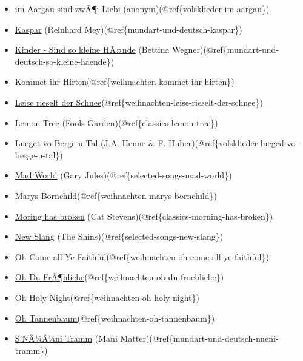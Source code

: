 \documentclass[
]{article}
\begin{document}
\begin{itemize}
\item
  \protect\hyperlink{volsklieder-im-aargau}{im Aargau sind zwÃ¶i Liebi}
  (anonym)(@ref\{volsklieder-im-aargau\})
\item
  \protect\hyperlink{mundart-und-deutsch-kaspar}{Kaspar} (Reinhard
  Mey)(@ref\{mundart-und-deutsch-kaspar\})
\item
  \protect\hyperlink{mundart-und-deutsch-so-kleine-haende}{Kinder - Sind
  so kleine HÃ¤nde} (Bettina
  Wegner)(@ref\{mundart-und-deutsch-so-kleine-haende\})
\item
  \protect\hyperlink{weihnachten-kommet-ihr-hirten}{Kommet ihr
  Hirten}(@ref\{weihnachten-kommet-ihr-hirten\})
\item
  \protect\hyperlink{weihnachten-leise-rieselt-der-schnee}{Leise rieselt
  der Schnee}(@ref\{weihnachten-leise-rieselt-der-schnee\})
\item
  \protect\hyperlink{classics-lemon-tree}{Lemon Tree} (Fools
  Garden)(@ref\{classics-lemon-tree\})
\item
  \protect\hyperlink{volsklieder-lueged-vo-berge-u-tal}{Lueget vo Berge
  u Tal} (J.A. Henne \& F.
  Huber)(@ref\{volsklieder-lueged-vo-berge-u-tal\})
\item
  \protect\hyperlink{selected-songs-mad-world}{Mad World} (Gary
  Jules)(@ref\{selected-songs-mad-world\})
\item
  \protect\hyperlink{weihnachten-marys-bornchild}{Marys
  Bornchild}(@ref\{weihnachten-marys-bornchild\})
\item
  \protect\hyperlink{classics-morning-has-broken}{Moring has broken}
  (Cat Stevens)(@ref\{classics-morning-has-broken\})
\item
  \protect\hyperlink{selected-songs-new-slang}{New Slang} (The
  Shins)(@ref\{selected-songs-new-slang\})
\item
  \protect\hyperlink{weihnachten-oh-come-all-ye-faithful}{Oh Come all Ye
  Faithful}(@ref\{weihnachten-oh-come-all-ye-faithful\})
\item
  \protect\hyperlink{weihnachten-oh-du-froehliche}{Oh Du
  FrÃ¶hliche}(@ref\{weihnachten-oh-du-froehliche\})
\item
  \protect\hyperlink{weihnachten-oh-holy-night}{Oh Holy
  Night}(@ref\{weihnachten-oh-holy-night\})
\item
  \protect\hyperlink{weihnachten-oh-tannenbaum}{Oh
  Tannenbaum}(@ref\{weihnachten-oh-tannenbaum\})
\item
  \protect\hyperlink{mundart-und-deutsch-nueni-tramm}{S'NÃ¼Ã¼ni Tramm}
  (Mani Matter)(@ref\{mundart-und-deutsch-nueni-tramm\})

\end{itemize}
\end{document}

